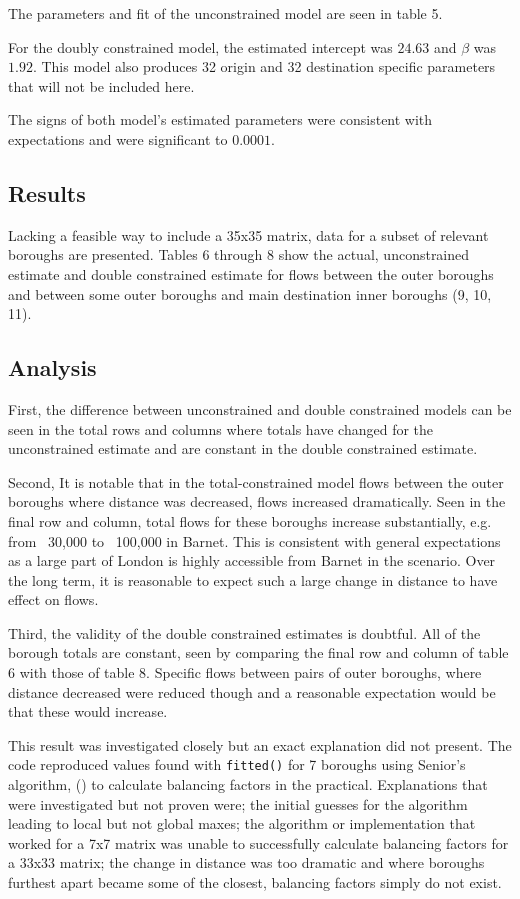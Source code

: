 \documentclass[11pt]{article} %
\begin{document}
The parameters and fit of the unconstrained model are seen in table 5.

For the doubly constrained model, the estimated intercept was $24.63$ and $\beta$ was $1.92$. This model also produces 32 origin and 32 destination specific parameters that will not be included here. 

The signs of both model's estimated parameters were consistent with expectations and were significant to $0.0001$.

\subsection{Results}

Lacking a feasible way to include a 35x35 matrix, data for a subset of relevant boroughs are presented. Tables 6 through 8 show the actual, unconstrained estimate and double constrained estimate for flows between the outer boroughs and between some outer boroughs and main destination inner boroughs (9, 10,  11). 

\subsection{Analysis}

First, the difference between unconstrained and double constrained models can be seen in the total rows and columns where totals have changed for the unconstrained estimate and are constant in the double constrained estimate. 

Second, It is notable that in the total-constrained model flows between the outer boroughs where distance was decreased, flows increased dramatically. Seen in the final row and column, total flows for these boroughs increase substantially, e.g. from ~30,000 to ~100,000 in Barnet. This is consistent with general expectations as a large part of London is highly accessible from Barnet in the scenario. Over the long term, it is reasonable to expect such a large change in distance to have effect on flows. 

Third, the validity of the double constrained estimates is doubtful. All of the borough totals are constant, seen by comparing the final row and column of table 6 with those of table 8. Specific flows between pairs of outer boroughs, where distance decreased were reduced though and a reasonable expectation would be that these would increase. 

This result was investigated closely but an exact explanation did not present. The code reproduced values found with \verb!fitted()! for 7 boroughs using Senior's algorithm, (\cite{senior1979gravity}) to calculate balancing factors in the practical. Explanations that were investigated but not proven were; the initial guesses for the algorithm leading to local but not global maxes; the algorithm or implementation that worked for a 7x7 matrix was unable to successfully calculate balancing factors for a 33x33 matrix; the change in distance was too dramatic and where boroughs furthest apart became some of the closest, balancing factors simply do not exist. 
\end{document}
